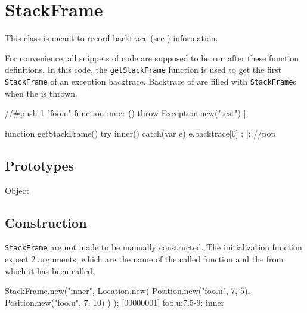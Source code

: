 
\section{StackFrame}

This class is meant to record backtrace (see )
information.

For convenience, all snippets of code are supposed to be run after these
function definitions.  In this code, the \lstinline|getStackFrame| function
is used to get the first \lstinline|StackFrame| of an exception backtrace.
Backtrace of  are filled with \lstinline|StackFrame|s
when the is thrown.

\begin{urbiscript}
//#push 1 "foo.u"
function inner () { throw Exception.new("test") }|;

function getStackFrame()
{
  try
  {
    inner()
  }
  catch(var e)
  {
    e.backtrace[0]
  };
}|;
//pop
\end{urbiscript}

\experimental{}

\subsection{Prototypes}
\begin{refObjects}
\item[Object]
\end{refObjects}

\subsection{Construction}

\lstinline|StackFrame| are not made to be manually constructed.  The
initialization function expect 2 arguments, which are the name of the called
function and the  from which it has been called.

\begin{urbiscript}
StackFrame.new("inner",
  Location.new(
    Position.new("foo.u", 7, 5),
    Position.new("foo.u", 7, 10)
  )
);
[00000001] foo.u:7.5-9: inner
\end{urbiscript}

